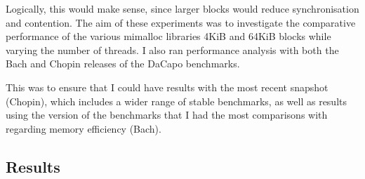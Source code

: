 \documentclass{article}
\begin{document}
Logically, this would make sense, since larger blocks would reduce synchronisation and contention. The aim of these experiments was to investigate the comparative performance of the various mimalloc libraries 4KiB and 64KiB blocks while varying the number of threads. I also ran performance analysis with both the Bach and Chopin releases of the DaCapo benchmarks.

This was to ensure that I could have results with the most recent snapshot (Chopin), which includes a wider range of stable benchmarks, as well as results using the version of the benchmarks that I had the most comparisons with regarding memory efficiency (Bach).

\subsection{Results}
\end{document}
